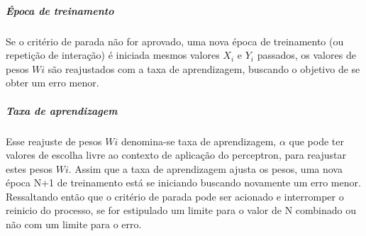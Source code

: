 \documentclass[	12pt, Times, openright, twoside, a4paper, english, brazil]{abntex2}
\begin{document}
            \subparagraph* {Época de treinamento}
            	Se o critério de parada não for aprovado, uma nova época de treinamento (ou repetição de interação) é iniciada mesmos valores $X_i$ e $Y_i$ passados, os valores de pesos $Wi$ são reajustados com a taxa de aprendizagem, buscando o objetivo de se obter um erro menor.
            	
            \subparagraph* {Taxa de aprendizagem}
            	Esse reajuste de pesos $Wi$ denomina-se taxa de aprendizagem, $\alpha$ que pode ter valores de escolha livre ao contexto de aplicação do perceptron, para reajustar estes pesos $Wi$. Assim que a taxa de aprendizagem ajusta os pesos, uma nova época N+1 de treinamento está se iniciando buscando novamente um erro menor. Ressaltando então que o critério de parada pode ser acionado e interromper o reinicio do processo, se for estipulado um limite para o valor de N combinado ou não com um limite para o erro. 
            	
\end{document}
